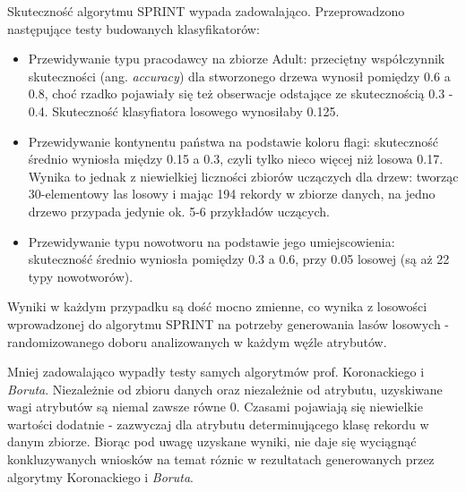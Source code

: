 \documentclass{article}
\begin{document}
Skuteczność algorytmu SPRINT wypada zadowalająco. Przeprowadzono następujące testy budowanych klasyfikatorów:
\begin{itemize}
	\item Przewidywanie typu pracodawcy na zbiorze Adult: przeciętny współczynnik skuteczności (ang. \emph{accuracy}) dla stworzonego drzewa wynosił pomiędzy 0.6 a 0.8, choć rzadko pojawiały się też obserwacje odstające ze skutecznością 0.3 - 0.4. Skuteczność klasyfiatora losowego wynosiłaby 0.125. 
	\item Przewidywanie kontynentu państwa na podstawie koloru flagi: skuteczność średnio wyniosła między 0.15 a 0.3, czyli tylko nieco więcej niż losowa 0.17. Wynika to jednak z niewielkiej liczności zbiorów uczączych dla drzew: tworząc 30-elementowy las losowy i mając 194 rekordy w zbiorze danych, na jedno drzewo przypada jedynie ok. 5-6 przykładów uczących. 
	\item Przewidywanie typu nowotworu na podstawie jego umiejscowienia: skuteczność średnio wyniosła pomiędzy 0.3 a 0.6, przy 0.05 losowej (są aż 22 typy nowotworów). 
\end{itemize}

Wyniki w każdym przypadku są dość mocno zmienne, co wynika z losowości wprowadzonej do algorytmu SPRINT na potrzeby generowania lasów losowych - randomizowanego doboru analizowanych w każdym węźle atrybutów. 

Mniej zadowalająco wypadły testy samych algorytmów prof. Koronackiego i \emph{Boruta}. Niezależnie od zbioru danych oraz niezależnie od atrybutu, uzyskiwane wagi atrybutów są niemal zawsze równe 0. Czasami pojawiają się niewielkie wartości dodatnie - zazwyczaj dla atrybutu determinującego klasę rekordu w danym zbiorze. Biorąc pod uwagę uzyskane wyniki, nie daje się wyciągnąć konkluzywanych wniosków na temat róznic w rezultatach generowanych przez algorytmy Koronackiego i \emph{Boruta}. 
\end{document}
